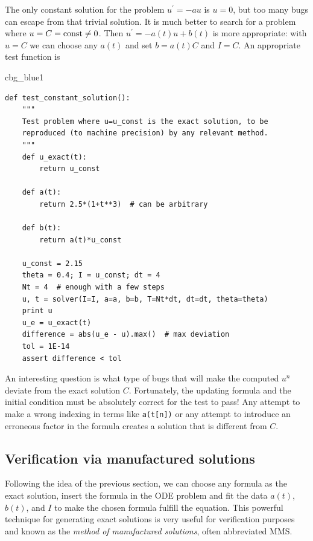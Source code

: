 \documentclass[%
oneside,                 %
final,                   %
10pt]{article}
\newenvironment{_cod_tight}[1]{
   \def\FrameCommand{\colorbox{#1}}
   \FrameRule0.6pt\MakeFramed {\FrameRestore}\vskip3mm}
   {\vskip0mm\endMakeFramed}
\newenvironment{cod}[1]{
\bgroup\rmfamily
\fboxsep=0mm\relax
\begin{_cod_tight}{#1}
\list{}{\parsep=-2mm\parskip=0mm\topsep=0pt\leftmargin=2mm
\rightmargin=2\leftmargin\leftmargin=4pt\relax}
\item\relax}
{\endlist\end{_cod_tight}\egroup}
\begin{document}
The only constant solution for the problem $u^{\prime}=-au$ is $u=0$, but too
many bugs can escape from that trivial solution.  It is much better to
search for a problem where $u=C=\hbox{const}\neq 0$.  Then $u^{\prime}=-a(t)u
+ b(t)$ is more appropriate: with $u=C$ we can choose any $a(t)$ and
set $b=a(t)C$ and $I=C$. An appropriate test function is

\begin{cod}{cbg_blue1}\begin{Verbatim}[numbers=none,fontsize=\fontsize{9pt}{9pt},baselinestretch=0.95,xleftmargin=2mm]
def test_constant_solution():
    """
    Test problem where u=u_const is the exact solution, to be
    reproduced (to machine precision) by any relevant method.
    """
    def u_exact(t):
        return u_const

    def a(t):
        return 2.5*(1+t**3)  # can be arbitrary

    def b(t):
        return a(t)*u_const

    u_const = 2.15
    theta = 0.4; I = u_const; dt = 4
    Nt = 4  # enough with a few steps
    u, t = solver(I=I, a=a, b=b, T=Nt*dt, dt=dt, theta=theta)
    print u
    u_e = u_exact(t)
    difference = abs(u_e - u).max()  # max deviation
    tol = 1E-14
    assert difference < tol
\end{Verbatim}
\end{cod}
\noindent

An interesting question is what type of bugs that will make the
computed $u^n$ deviate from the exact solution $C$.
Fortunately, the updating formula and the initial condition must
be absolutely correct for the test to pass! Any attempt to make
a wrong indexing in terms like \texttt{a(t[n])} or any attempt to
introduce an erroneous factor in the formula creates a solution
that is different from $C$.


\subsection{Verification via manufactured solutions}
\label{decay:MMS}


Following the idea of the previous section, we can choose any formula
as the exact solution, insert the formula in the ODE problem and fit
the data $a(t)$, $b(t)$, and $I$ to make the chosen
formula fulfill the equation. This
powerful technique for generating exact solutions is very useful for
verification purposes and known as the \emph{method of manufactured
solutions}, often abbreviated MMS.
\end{document}
